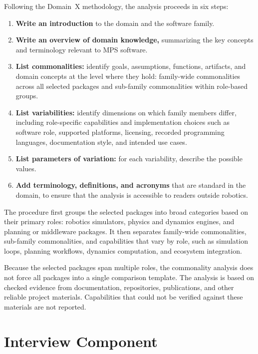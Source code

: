 Following the Domain~X methodology, the analysis proceeds in six steps:

\begin{enumerate}
    \item \textbf{Write an introduction} to the domain and the software family.
    \item \textbf{Write an overview of domain knowledge,} summarizing the key concepts and terminology relevant to MPS software.
    \item \textbf{List commonalities:} identify goals, assumptions, functions, artifacts, and domain concepts at the level where they hold: family-wide commonalities across all selected packages and sub-family commonalities within role-based groups.
    \item \textbf{List variabilities:} identify dimensions on which family members differ, including role-specific capabilities and implementation choices such as software role, supported platforms, licensing, recorded programming languages, documentation style, and intended use cases.
    \item \textbf{List parameters of variation:} for each variability, describe the possible values.
    \item \textbf{Add terminology, definitions, and acronyms} that are standard in the domain, to ensure that the analysis is accessible to readers outside robotics.
\end{enumerate}

The procedure first groups the selected packages into broad categories based on their primary roles: robotics simulators, physics and dynamics engines, and planning or middleware packages. It then separates family-wide commonalities, sub-family commonalities, and capabilities that vary by role, such as simulation loops, planning workflows, dynamics computation, and ecosystem integration.

Because the selected packages span multiple roles, the commonality analysis does not force all packages into a single comparison template. The analysis is based on checked evidence from documentation, repositories, publications, and other reliable project materials. Capabilities that could not be verified against these materials are not reported.

\section{Interview Component}
\label{sec:interview-component}

